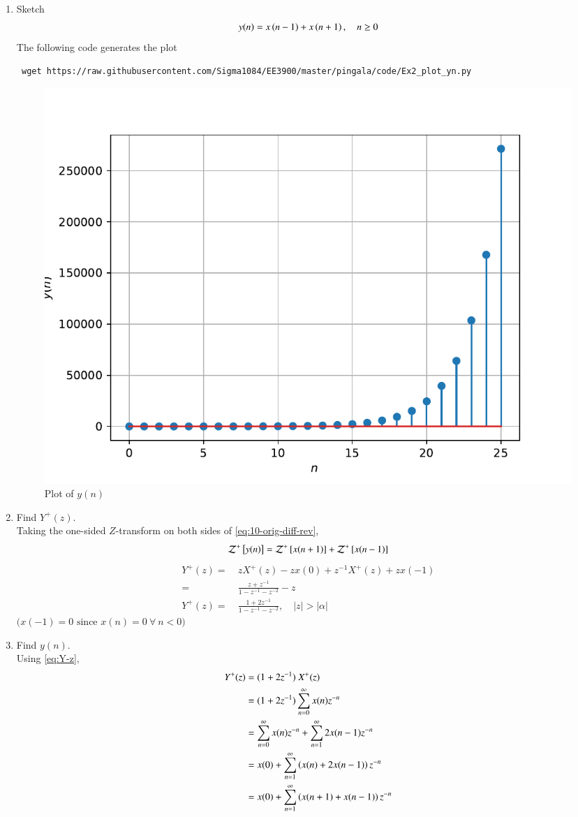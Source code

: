 \documentclass[journal,12pt,twocolumn]{IEEEtran}
\renewcommand\thesection{\arabic{section}}
\begin{document}
\begin{enumerate}[label=\thesection.\arabic*,ref=\thesection.\theenumi]
\item Sketch
	\begin{align}
		y(n) = x\left(n-1\right) + x\left(n+1\right), \quad n \ge 0
		\label{eq:10-orig-diff-rev}
 	\end{align}
	 \solution The following code generates the plot
	 \begin{lstlisting}
 wget https://raw.githubusercontent.com/Sigma1084/EE3900/master/pingala/code/Ex2_plot_yn.py
	 \end{lstlisting}
	 \begin{figure}[!htp]
		 \includegraphics[width=\columnwidth]{../figs/y_n.pdf}
		 \caption{Plot of $y(n)$}
		 \label{fig:y-n}
	 \end{figure}


\item Find $Y^{+}(z)$. \\
	\solution
	Taking the one-sided $Z$-transform on both sides of \eqref{eq:10-orig-diff-rev},
	\[
		\mathcal{Z}^+{}\left[y(n)\right] = \mathcal{Z}^+{}\left[x(n + 1)\right] + \mathcal{Z}^+{}\left[x(n - 1)\right]
	\]
	\begin{align}
		Y^+(z) =& \ zX^+(z) - zx(0) + z^{-1}X^+(z) + zx(-1) \nonumber \\
		=& \ \frac{z + z^{-1}}{1 - z^{-1} - z^{-2}} - z \nonumber \\
		Y^+(z) =& \ \frac{1 + 2z^{-1}}{1 - z^{-1} - z^{-2}}, \quad |z| > |\alpha| \label{eq:Y-z}
	\end{align}
	\ensuremath{\big( x(-1) = 0 \text{ since } x(n) = 0 \ \forall\ n < 0 \big)}

\item Find $y(n)$. \\
	\solution Using \eqref{eq:Y-z},
	\begin{align*}
		Y^+(z) &= (1 + 2z^{-1}) \ X^+(z) \\
			&= (1 + 2z^{-1})\sum_{n = 0}^{\infty}x(n)z^{-n} \\
			&= \sum_{n = 0}^{\infty}x(n)z^{-n} + \sum_{n = 1}^{\infty}2x(n - 1)z^{-n} \\
			&= x(0) + \sum_{n = 1}^{\infty}\left(x(n) + 2x(n - 1)\right)z^{-n} \\
			&= x(0) + \sum_{n = 1}^{\infty}\left(x(n + 1) + x(n - 1)\right)z^{-n}
	\end{align*}


\end{enumerate}
\end{document}
